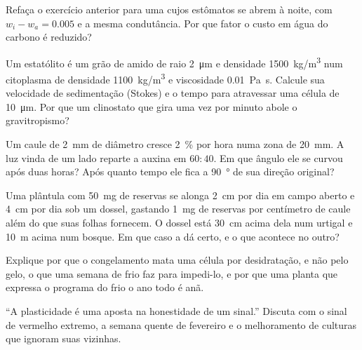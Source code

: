 \begin{exercise}[$\star\star$]\label{exo:b2:plant-plasticity:7}
Refaça o exercício anterior para uma  cujos estômatos se abrem
à noite, com $w_i - w_a = 0.005$ e a mesma condutância. Por que fator o
custo em água do carbono é reduzido?
\end{exercise}

\begin{exercise}[$\star\star$]\label{exo:b2:plant-plasticity:8}
Um estatólito é um grão de amido de raio \qty{2}{\micro m} e densidade
\qty{1500}{kg/m^3} num citoplasma de densidade \qty{1100}{kg/m^3} e
viscosidade \qty{0.01}{Pa.s}. Calcule sua velocidade de sedimentação
(Stokes) e o tempo para atravessar uma célula de \qty{10}{\micro m}.
Por que um clinostato que gira uma vez por minuto abole o
gravitropismo?
\end{exercise}

\begin{exercise}[$\star\star$]\label{exo:b2:plant-plasticity:9}
Um caule de \qty{2}{mm} de diâmetro cresce \qty{2}{\%} por hora numa
zona de \qty{20}{mm}. A luz vinda de um lado reparte a auxina em
$60 : 40$. Em que ângulo ele se curvou após duas horas? Após quanto
tempo ele fica a \qty{90}{\degree} de sua direção original?
\end{exercise}

\begin{exercise}[$\star\star\star$]\label{exo:b2:plant-plasticity:10}
Uma plântula com \qty{50}{mg} de reservas se alonga \qty{2}{cm} por dia
em campo aberto e \qty{4}{cm} por dia sob um dossel, gastando
\qty{1}{mg} de reservas por centímetro de caule além do que suas folhas
fornecem. O dossel está \qty{30}{cm} acima dela num urtigal e
\qty{10}{m} acima num bosque. Em que caso a  dá
certo, e o que acontece no outro?
\end{exercise}

\begin{exercise}[$\star\star\star$]\label{exo:b2:plant-plasticity:11}
Explique por que o congelamento mata uma célula por desidratação, e não
pelo gelo, o que uma semana de frio faz para impedi-lo, e por que uma
planta que expressa o programa do frio o ano todo é anã.
\end{exercise}

\begin{exercise}[$\star\star\star$]\label{exo:b2:plant-plasticity:12}
``A plasticidade é uma aposta na honestidade de um sinal.'' Discuta com
o sinal de vermelho extremo, a semana quente de fevereiro e o
melhoramento de culturas que ignoram suas vizinhas.
\end{exercise}

